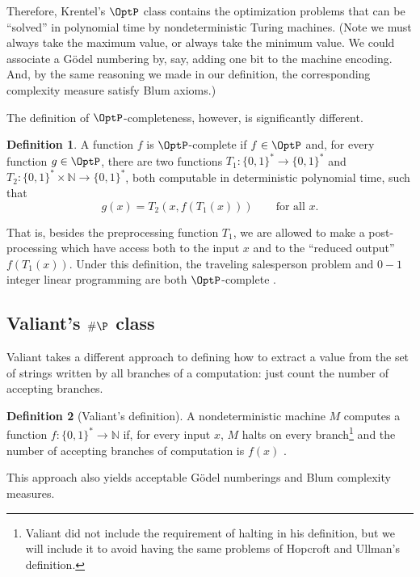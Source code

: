 \documentclass[12pt]{article}
\theoremstyle{definition}
\newtheorem{definition}{Definition}
\begin{document}
Therefore, Krentel's $\OptP$ class contains the optimization problems
that can be ``solved'' in polynomial time by nondeterministic Turing machines.
(Note we must always take the maximum value, or always take the minimum value.
We could associate a Gödel numbering by, say,
adding one bit to the machine encoding.
And, by the same reasoning we made in our definition,
the corresponding complexity measure satisfy Blum axioms.)

The definition of $\OptP$-completeness, however,
is significantly different.

\begin{definition}
    A function $f$ is $\OptP$-complete if $f \in \OptP$ and,
    for every function $g \in \OptP$,
    there are two functions $T_1 : \{0, 1\}^* \to \{0, 1\}^*$
    and $T_2 : \{0, 1\}^* \times \mathbb N \to \{0, 1\}^*$,
    both computable in deterministic polynomial time,
    such that
    \begin{equation*}
        g(x) = T_2( x, f(T_1(x)) ) \qquad \text{for all $x$.}
    \end{equation*}
\end{definition}

That is, besides the preprocessing function $T_1$,
we are allowed to make a post-processing which have access
both to the input $x$ and to the ``reduced output'' $f(T_1(x))$.
Under this definition,
the traveling salesperson problem and $0-1$ integer linear programming
are both $\OptP$-complete \cite[p~495]{Krentel1988}.

\subsection{Valiant's $\#\P$ class}

Valiant takes a different approach to defining how to extract a value
from the set of strings written by all branches of a computation:
just count the number of accepting branches.

\begin{definition}[Valiant's definition]
    A nondeterministic machine $M$ computes a function $f: \{0, 1\}^* \to \mathbb N$ if,
    for every input $x$,
    $M$ halts on every branch\footnote{
        Valiant did not include the requirement of halting in his definition,
        but we will include it to avoid having the same problems
        of Hopcroft and Ullman's definition.
    }
    and the number of accepting branches of computation is $f(x)$
    \cite[p.~191]{Valiant1979}.
\end{definition}
This approach also yields acceptable Gödel numberings and Blum complexity measures.
\end{document}
